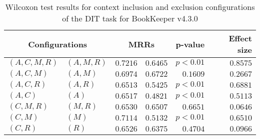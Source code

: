 
\begin{table}
\begin{spacing}{1.2}
\centering
\caption{Wilcoxon test results for context inclusion and exclusion configurations of the DIT task for BookKeeper v4.3.0}
\label{table:versus-wilcox-bookkeeper-dit-context}
\begin{tabular}{ll|rr|rr}
\toprule
      \multicolumn{2}{c|}{Configurations} &          \multicolumn{2}{c|}{MRRs} &       p-value & Effect size \\
\midrule
 $(A,C,M,R)$ &  $(A,M,R)$ & $0.7216$ & $0.6465$ & $p<0.01$ &    $0.8575$ \\
   $(A,C,M)$ &    $(A,M)$ & $0.6974$ & $0.6722$ & $0.1609$ &    $0.2667$ \\
   $(A,C,R)$ &    $(A,R)$ & $0.6513$ & $0.5425$ & $p<0.01$ &    $0.6881$ \\
     $(A,C)$ &      $(A)$ & $0.6517$ & $0.4821$ & $p<0.01$ &    $0.5113$ \\
   $(C,M,R)$ &    $(M,R)$ & $0.6530$ & $0.6507$ & $0.6651$ &    $0.0646$ \\
     $(C,M)$ &      $(M)$ & $0.7114$ & $0.5132$ & $p<0.01$ &    $0.6510$ \\
     $(C,R)$ &      $(R)$ & $0.6526$ & $0.6375$ & $0.4704$ &    $0.0966$ \\
\bottomrule
\end{tabular}

\end{spacing}
\end{table}

